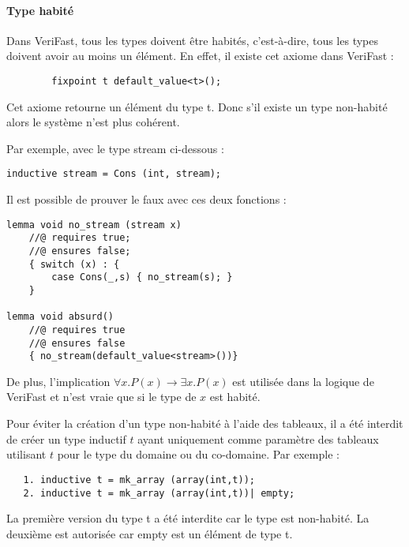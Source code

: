\documentclass[11pt,openany]{article}
\newcommand{\verifast}{VeriFast}
\begin{document}
			\paragraph{Type habit\'e}
				Dans \verifast{}, tous les types doivent \^etre habit\'es, c'est-\`a-dire, tous les types doivent avoir au moins un \'el\'ement. En effet, il existe cet axiome dans \verifast{} :
		\begin{lstlisting}
		fixpoint t default_value<t>();
		\end{lstlisting}
		Cet axiome retourne un \'el\'ement du type t. Donc s'il existe un type non-habit\'e alors le syst\`eme n'est plus coh\'erent. \par
		Par exemple, avec le type stream ci-dessous :
\begin{lstlisting}
inductive stream = Cons (int, stream);
\end{lstlisting}
Il est possible de prouver le faux avec ces deux fonctions :
\begin{lstlisting}
lemma void no_stream (stream x)
	//@ requires true;
	//@ ensures false;
	{ switch (x) : {
		case Cons(_,s) { no_stream(s); }
	}

lemma void absurd()
	//@ requires true
	//@ ensures false
	{ no_stream(default_value<stream>())}

		\end{lstlisting}
\par De plus, l'implication
				$\forall x. P(x) \rightarrow \exists x. P(x)$ est utilis\'ee dans la logique de \verifast{} et n'est vraie que si le type de $x$ est habit\'e.\par
				
				Pour \'eviter la cr\'eation d'un type non-habit\'e \`a l'aide des tableaux, il a \'et\'e interdit de cr\'eer un type inductif $t$ ayant uniquement comme param\`etre des tableaux utilisant $t$ pour le type du domaine ou du co-domaine. Par exemple :
				\begin{lstlisting}			
   1. inductive t = mk_array (array(int,t));
   2. inductive t = mk_array (array(int,t))| empty;
				\end{lstlisting}
	La premi\`ere version du type t a \'et\'e interdite car le type est non-habit\'e. La deuxi\`eme est autoris\'ee car empty est un \'el\'ement de type t.
\end{document}
